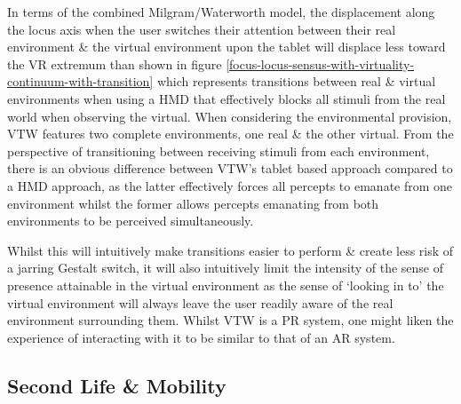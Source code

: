 In terms of the combined Milgram/Waterworth model, the displacement along the locus axis when the user switches their attention between their real environment \& the virtual environment upon the tablet will displace less toward the VR extremum than shown in figure \ref{focus-locus-sensus-with-virtuality-continuum-with-transition} which represents transitions between real \& virtual environments when using a HMD that effectively blocks all stimuli from the real world when observing the virtual. When considering the environmental provision, VTW features two complete environments, one real \& the other virtual. From the perspective of transitioning between receiving stimuli from each environment, there is an obvious difference between VTW's tablet based approach compared to a HMD approach, as the latter effectively forces all percepts to emanate from one environment whilst the former allows percepts emanating from both environments to be perceived simultaneously.

Whilst this will intuitively make transitions easier to perform \& create less risk of a jarring Gestalt switch, it will also intuitively limit the intensity of the sense of presence attainable in the virtual environment as the sense of `looking in to' the virtual environment will always leave the user readily aware of the real environment surrounding them. Whilst VTW is a PR system, one might liken the experience of interacting with it to be similar to that of an AR system.




\subsection{Second Life \& Mobility}

\label{SecondLifeMobility}

\newcommand{\LumiyaFootnote}{\footnote{\url{https://play.google.com/store/apps/details?id=com.lumiyaviewer.lumiya&hl=en_GB}}}

